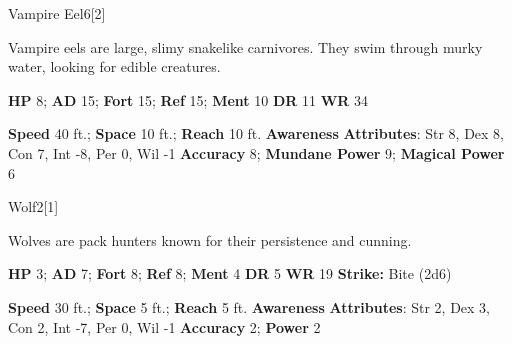   \begin{monsection}{Vampire Eel}{6}[2]
    \vspace{-1em}\vspace{-1em}
    \vspace{0em}

    
      Vampire eels are large, slimy snakelike carnivores.
      They swim through murky water, looking for edible creatures.
    

    \begin{spellcontent}
      \begin{spelltargetinginfo}
        \pari \textbf{HP} 8;
          \textbf{AD} 15;
          \textbf{Fort} 15;
          \textbf{Ref} 15;
          \textbf{Ment} 10
        \pari \textbf{DR} 11
        \pari \textbf{WR} 34
        
      \end{spelltargetinginfo}
    \end{spellcontent}
    \begin{monsterfooter}
      \pari \textbf{Speed} 40 ft.;
        \textbf{Space} 10 ft.;
        \textbf{Reach} 10 ft.
      \pari \textbf{Awareness} 
      \pari \textbf{Attributes}:
        Str 8, Dex 8,
        Con 7, Int -8,
        Per 0, Wil -1
      \pari \textbf{Accuracy} 8;
        \textbf{Mundane Power} 9;
      \textbf{Magical Power} 6
    \end{monsterfooter}
  \end{monsection}
  
  
  \begin{monsection}{Wolf}{2}[1]
    \vspace{-1em}\vspace{-1em}
    \vspace{0em}

    
      Wolves are pack hunters known for their persistence and cunning.
    

    \begin{spellcontent}
      \begin{spelltargetinginfo}
        \pari \textbf{HP} 3;
          \textbf{AD} 7;
          \textbf{Fort} 8;
          \textbf{Ref} 8;
          \textbf{Ment} 4
        \pari \textbf{DR} 5
        \pari \textbf{WR} 19
        \pari \textbf{Strike:}
            Bite  (2d6)
      \end{spelltargetinginfo}
    \end{spellcontent}
    \begin{monsterfooter}
      \pari \textbf{Speed} 30 ft.;
        \textbf{Space} 5 ft.;
        \textbf{Reach} 5 ft.
      \pari \textbf{Awareness} 
      \pari \textbf{Attributes}:
        Str 2, Dex 3,
        Con 2, Int -7,
        Per 0, Wil -1
      \pari \textbf{Accuracy} 2;
        \textbf{Power} 2
    \end{monsterfooter}
  \end{monsection}
  
